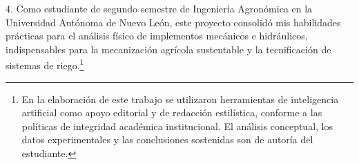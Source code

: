 4. Como estudiante de segundo semestre de Ingeniería Agronómica en la Universidad Autónoma de Nuevo León, este proyecto consolidó mis habilidades prácticas para el análisis físico de implementos mecánicos e hidráulicos, indispensables para la mecanización agrícola sustentable y la tecnificación de sistemas de riego.\footnote{En la elaboración de este trabajo se utilizaron herramientas de inteligencia artificial como apoyo editorial y de redacción estilística, conforme a las políticas de integridad académica institucional. El análisis conceptual, los datos experimentales y las conclusiones sostenidas son de autoría del estudiante.}
